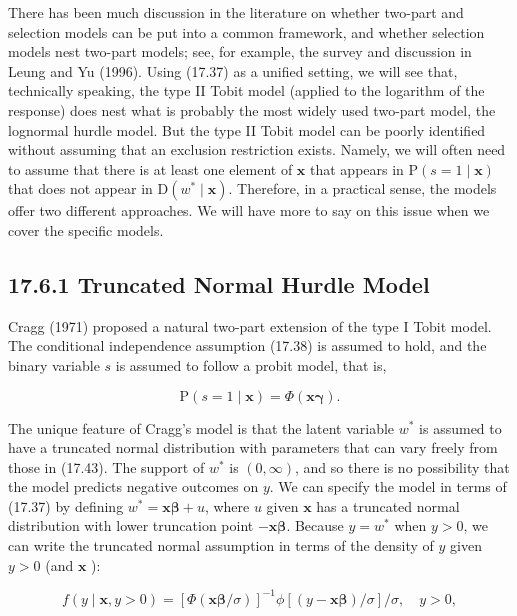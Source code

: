 \documentclass[10pt]{article}
\begin{document}
There has been much discussion in the literature on whether two-part and selection models can be put into a common framework, and whether selection models nest two-part models; see, for example, the survey and discussion in Leung and Yu (1996). Using (17.37) as a unified setting, we will see that, technically speaking, the type II Tobit model (applied to the logarithm of the response) does nest what is probably the most widely used two-part model, the lognormal hurdle model. But the type II Tobit model can be poorly identified without assuming that an exclusion restriction exists. Namely, we will often need to assume that there is at least one element of $\mathbf{x}$ that appears in $\mathrm{P}(s=1 \mid \mathbf{x})$ that does not appear in $\mathrm{D}\left(w^{*} \mid \mathbf{x}\right)$. Therefore, in a practical sense, the models offer two different approaches. We will have more to say on this issue when we cover the specific models.

\subsection*{17.6.1 Truncated Normal Hurdle Model}
Cragg (1971) proposed a natural two-part extension of the type I Tobit model. The conditional independence assumption (17.38) is assumed to hold, and the binary variable $s$ is assumed to follow a probit model, that is,


\begin{equation*}
\mathrm{P}(s=1 \mid \mathbf{x})=\Phi(\mathbf{x} \boldsymbol{\gamma}) . \tag{17.43}
\end{equation*}


The unique feature of Cragg's model is that the latent variable $w^{*}$ is assumed to have a truncated normal distribution with parameters that can vary freely from those in (17.43). The support of $w^{*}$ is $(0, \infty)$, and so there is no possibility that the model predicts negative outcomes on $y$. We can specify the model in terms of (17.37) by defining $w^{*}=\mathbf{x} \boldsymbol{\beta}+u$, where $u$ given $\mathbf{x}$ has a truncated normal distribution with lower truncation point $-\mathbf{x} \boldsymbol{\beta}$. Because $y=w^{*}$ when $y>0$, we can write the truncated normal assumption in terms of the density of $y$ given $y>0$ (and $\mathbf{x}$ ):


\begin{equation*}
f(y \mid \mathbf{x}, y>0)=[\Phi(\mathbf{x} \boldsymbol{\beta} / \sigma)]^{-1} \phi[(y-\mathbf{x} \boldsymbol{\beta}) / \sigma] / \sigma, \quad y>0, \tag{17.44}
\end{equation*}
\end{document}
